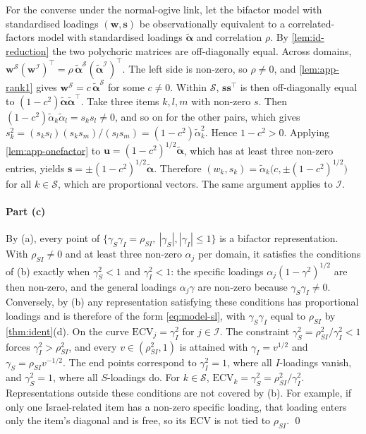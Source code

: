 For the converse under the normal-ogive link, let the bifactor model with standardised loadings $(\bm w,\bm s)$ be observationally equivalent to a correlated-factors model with standardised loadings $\tilde{\bm\alpha}$ and correlation $\rho$. By \cref{lem:id-reduction} the two polychoric matrices are off-diagonally equal. Across domains, $\bm w^{\mathcal S}(\bm w^{\mathcal I})^\top=\rho\,\tilde{\bm\alpha}^{\mathcal S}(\tilde{\bm\alpha}^{\mathcal I})^\top$. The left side is non-zero, so $\rho\neq0$, and \cref{lem:app-rank1} gives $\bm w^{\mathcal S}=c\,\tilde{\bm\alpha}^{\mathcal S}$ for some $c\neq0$. Within $\mathcal S$, $\bm s\bm s^\top$ is then off-diagonally equal to $(1-c^2)\tilde{\bm\alpha}\tilde{\bm\alpha}^\top$. Take three items $k,l,m$ with non-zero $s$. Then $(1-c^2)\tilde\alpha_k\tilde\alpha_l=s_ks_l\neq0$, and so on for the other pairs, which gives $s_k^2=(s_ks_l)(s_ks_m)/(s_ls_m)=(1-c^2)\tilde\alpha_k^2$. Hence $1-c^2>0$. Applying \cref{lem:app-onefactor} to $\bm u=(1-c^2)^{1/2}\tilde{\bm\alpha}$, which has at least three non-zero entries, yields $\bm s=\pm(1-c^2)^{1/2}\tilde{\bm\alpha}$. Therefore $(w_k,s_k)=\tilde\alpha_k\bigl(c,\pm(1-c^2)^{1/2}\bigr)$ for all $k\in\mathcal S$, which are proportional vectors. The same argument applies to $\mathcal I$.

\paragraph{Part (c)}
By (a), every point of $\{\gamma_S\gamma_I=\rho_{SI},\ |\gamma_S|,|\gamma_I|\le1\}$ is a bifactor representation. With $\rho_{SI}\neq0$ and at least three non-zero $\alpha_j$ per domain, it satisfies the conditions of (b) exactly when $\gamma_S^2<1$ and $\gamma_I^2<1$: the specific loadings $\alpha_j(1-\gamma^2)^{1/2}$ are then non-zero, and the general loadings $\alpha_j\gamma$ are non-zero because $\gamma_S\gamma_I\neq0$. Conversely, by (b) any representation satisfying these conditions has proportional loadings and is therefore of the form \eqref{eq:model-sl}, with $\gamma_S\gamma_I$ equal to $\rho_{SI}$ by \cref{thm:ident}(d). On the curve $\mathrm{ECV}_j=\gamma_I^2$ for $j\in\mathcal I$. The constraint $\gamma_S^2=\rho_{SI}^2/\gamma_I^2<1$ forces $\gamma_I^2>\rho_{SI}^2$, and every $v\in(\rho_{SI}^2,1)$ is attained with $\gamma_I=v^{1/2}$ and $\gamma_S=\rho_{SI}v^{-1/2}$. The end points correspond to $\gamma_I^2=1$, where all $I$-loadings vanish, and $\gamma_S^2=1$, where all $S$-loadings do. For $k\in\mathcal S$, $\mathrm{ECV}_k=\gamma_S^2=\rho_{SI}^2/\gamma_I^2$. Representations outside these conditions are not covered by (b). For example, if only one Israel-related item has a non-zero specific loading, that loading enters only the item's diagonal and is free, so its ECV is not tied to $\rho_{SI}$. \qed

